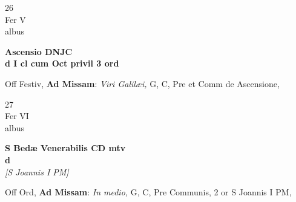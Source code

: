 \documentclass[10pt, openany]{book}
\begin{document}
        \begin{center}
            \begin{minipage}{3.5in}
                \vspace{2em}
                \begin{minipage}{0.5in}
                    {\Huge 26} \\
                    {\normalsize Fer V} \\
                    {\normalsize albus}
                \end{minipage}
                \begin{minipage}{3.0in}
                    \textbf{ \large Ascensio DNJC \\
                    \textnormal{\normalsize d I cl cum Oct privil 3 ord}} \\ 
                \end{minipage}
                \begin{justify}Off Festiv, \textbf{Ad Missam}: \textit{Viri Galilæi,} G, C, Pre et Comm de Ascensione,   
                \end{justify}
            \end{minipage}
        \end{center}
    
        \begin{center}
            \begin{minipage}{3.5in}
                \vspace{2em}
                \begin{minipage}{0.5in}
                    {\Huge 27} \\
                    {\normalsize Fer VI} \\
                    {\normalsize albus}
                \end{minipage}
                \begin{minipage}{3.0in}
                    \textbf{ \large S Bedæ Venerabilis CD mtv \\
                    \textnormal{\normalsize d}} \\ \textit{[S Joannis I PM]} \\ 
                \end{minipage}
                \begin{justify}Off Ord, \textbf{Ad Missam}: \textit{In medio,} G, C, Pre Communis, 2 or S Joannis I PM,   
                \end{justify}
            \end{minipage}
        \end{center}
    
\end{document}
